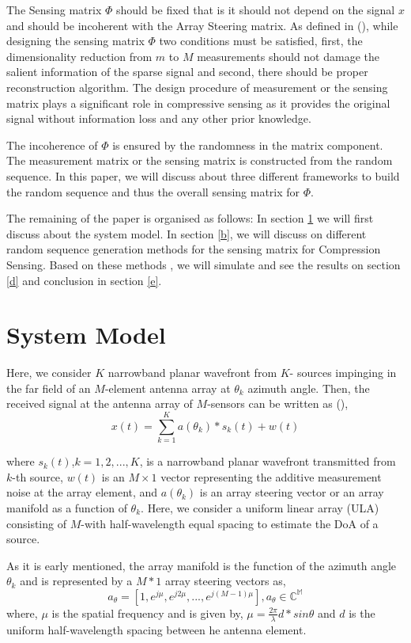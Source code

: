 \documentclass[10pt,conference]{IEEEtran}
\begin{document}
The Sensing matrix $\Phi$ should be fixed that is it should not depend on the signal $x$ and should be incoherent with the Array Steering matrix. As defined in (), while designing the sensing matrix $\Phi$ two conditions must be satisfied, first, the dimensionality reduction from $m$ to $M$ measurements  should not damage the salient information  of the sparse signal and second, there should be proper reconstruction algorithm. The design procedure of measurement or the sensing matrix plays a significant role in compressive sensing as it provides the original signal without information loss and any other prior knowledge. 

The incoherence of $\Phi$ is ensured by the randomness in the matrix component. The measurement matrix or the sensing matrix is constructed from the random sequence. In this paper, we will discuss about three different frameworks to build the random sequence and thus the overall sensing matrix for $\Phi$.

The remaining of the paper is organised as follows: In section \ref{a} we will first discuss about the system model. In section \ref{b}, we will discuss on different random sequence generation methods for the sensing matrix for Compression Sensing. Based on these methods , we will simulate and see the results on section \ref{d} and conclusion in section \ref{e}.
\section{System Model}  \label{a}
Here, we consider $K$ narrowband planar wavefront from $K$- sources impinging in the far field of an $M$-element antenna array at $\theta_{k}$ azimuth angle. Then, the received signal at the antenna array of $M$-sensors can be written as (),
\begin{equation} \label{1}
x(t)= \sum_{k=1}^{K}a(\theta_{k})*s_{k}(t)+w(t)
\end{equation} 

where $s_{k}(t)$,$ k = 1, 2, . . . , K$, is a  narrowband planar wavefront transmitted from $k$-th source, $w(t)$ is an $M × 1$ vector representing the additive measurement noise
at the array element, and $ a(\theta_{k})$ is an array steering vector or an array manifold as a function of  $\theta_{k}$. 
Here, we consider a uniform linear array (ULA) consisting of $M$-with half-wavelength equal spacing to estimate the DoA of a source.

As it is early mentioned, the array manifold is the function of the azimuth angle $\theta_{k}$ and is represented by a $M*1$ array steering vectors as,
\begin{equation} 
a_{\theta}= [1,e^{j\mu},e^{j2\mu},...,e^{j(M-1)\mu}] ,                   a_{\theta} \in \mathbb{C^{M}}
\end{equation}
where, $\mu$ is the spatial frequency and is given by, $\mu=\frac{2\pi}{\lambda} d*sin{\theta}$  and $d$ is the uniform half-wavelength spacing between he antenna element.
\end{document}

